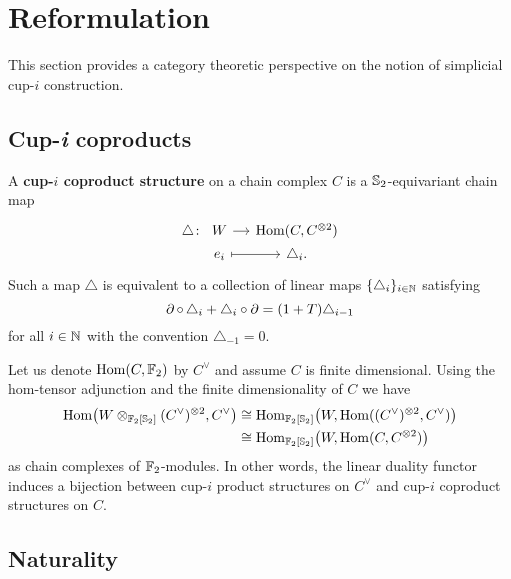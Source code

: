 
\section{Reformulation}\label{s:reformulation}

This section provides a category theoretic perspective on the notion of simplicial \mbox{cup-$i$} construction.

\subsection{Cup-\textit{i} coproducts}

A \textbf{cup-$i$ coproduct structure} on a chain complex $C$ is a $\mathbb{S}_2$-equivariant chain map
\[
\begin{tikzcd}[column sep=small,row sep=0]
	\triangle \colon &[-15pt] W \rar & \Hom(C, C^{\ot 2}) \\
	& e_i \rar[maps to] & \triangle_i.
\end{tikzcd}
\]
Such a map $\triangle$ is equivalent to a collection of linear maps $\{\triangle_i\}_{i\in\mathbb{N}}$ satisfying
\[
\operatorname{\partial} \circ \, \triangle_i + \triangle_i \circ \operatorname{\partial} =
(1+T) \triangle_{i-1}
\]
for all $i \in \mathbb{N}$ with the convention $\triangle_{-1} = 0$.

Let us denote $\mathrm{Hom}(C, {\mathbb{F}_2})$ by $C^\vee$ and assume $C$ is finite dimensional.
Using the hom-tensor adjunction and the finite dimensionality of $C$ we have
\begin{equation}\label{eq:hom-tensor}
	\begin{split}
		\mathrm{Hom} \big(W \otimes_{{\mathbb{F}_2}[\mathbb{S}_2]} (C^\vee)^{\otimes 2}, C^\vee \big) & \cong
		\mathrm{Hom}_{{\mathbb{F}_2}[\mathbb{S}_2]} \big( W, \mathrm{Hom}((C^\vee)^{\otimes 2}, C^\vee) \big) \\ & \cong
		\mathrm{Hom}_{{\mathbb{F}_2}[\mathbb{S}_2]} \big( W, \mathrm{Hom}(C, C^{\otimes 2}) \big)
	\end{split}
\end{equation}
as chain complexes of ${\mathbb{F}_2}$-modules.
In other words, the linear duality functor induces a bijection between \mbox{cup-$i$} product structures on $C^\vee$ and cup-$i$ coproduct structures on $C$.

\subsection{Naturality}\label{ss:naturality}

